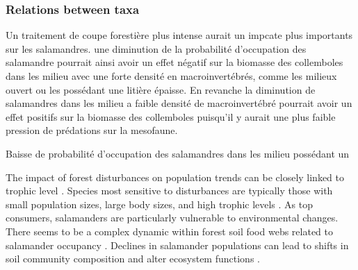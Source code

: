 

\subsubsection*{Relations between taxa}
\label{disc:relations_between_taxa}



Un traitement de coupe forestière plus intense aurait un impcate plus importants sur les salamandres. 
une diminution de la probabilité d'occupation des salamandre pourrait ainsi avoir un effet négatif sur la biomasse des collemboles dans les milieu avec une forte densité en macroinvertébrés, comme les milieux ouvert ou les possédant une litière épaisse.
En revanche la diminution de salamandres dans les milieu a faible densité de macroinvertébré pourrait avoir un effet positifs sur la biomasse des collemboles puisqu'il y aurait une plus faible pression de prédations sur la mesofaune. 

Baisse de probabilité d'occupation des salamandres dans les milieu possédant un 



The impact of forest disturbances on population trends can be closely linked to trophic level \citep{Gotelli2006FoodWebModels,Nolte2019Habitatspecialization}. 
Species most sensitive to disturbances are typically those with small population sizes, large body sizes, and high trophic levels \citep{Seibold2015Associationextinction,Nolte2019Habitatspecialization,Hagge2021Whatdoes}. 
As top consumers, salamanders are particularly vulnerable to environmental changes. 
There seems to be a complex dynamic within forest soil food webs related to salamander occupancy \citep{baileyEstimatingSiteOccupancy2004,Walton2006Salamandersforestfloor,Rooney2000impactsalamander}. 
Declines in salamander populations can lead to shifts in soil community composition and alter ecosystem functions \citep{Hairston1987evolutioncompeting,Wyman1998Experimentalassessment,Rooney2000impactsalamander,Walton2005Contrastingeffects}.

